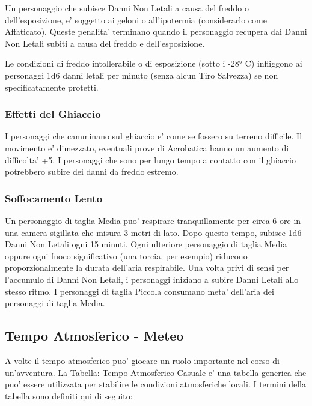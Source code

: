 \documentclass[a4paper,11pt,twoside,openany]{book}
\begin{document}
{		Un personaggio che subisce Danni Non Letali a causa del freddo o dell'esposizione, e' soggetto ai geloni o all'ipotermia (considerarlo come Affaticato). Queste penalita' terminano quando il personaggio recupera dai Danni Non Letali subiti a causa del freddo e dell'esposizione. 
		
		Le condizioni di freddo intollerabile o di esposizione (sotto i -28° C) infliggono ai personaggi 1d6 danni letali per minuto (senza alcun Tiro Salvezza) se non specificatamente protetti.
		
		\subsubsection{Effetti del Ghiaccio}
		
		I personaggi che camminano sul ghiaccio e' come se fossero su terreno difficile. Il movimento e' dimezzato, eventuali prove di Acrobatica hanno un aumento di difficolta' +5. I personaggi che sono per lungo tempo a contatto con il ghiaccio potrebbero subire dei danni da freddo estremo.
		
		\subsubsection{Soffocamento Lento}
		
		Un personaggio di taglia Media puo' respirare tranquillamente per circa 6 ore in una camera sigillata che misura 3 metri di lato. Dopo questo tempo, subisce 1d6 Danni Non Letali ogni 15 minuti. Ogni ulteriore personaggio di taglia Media oppure ogni fuoco significativo (una torcia, per esempio) riducono proporzionalmente la durata dell'aria respirabile. Una volta privi di sensi per l'accumulo di Danni Non Letali, i personaggi iniziano a subire Danni Letali allo stesso ritmo. I personaggi di taglia Piccola consumano meta' dell'aria dei personaggi di taglia Media.
		
		\pagebreak
		
		\subsection{Tempo Atmosferico - Meteo}
		
		\label{tempo-atmosferico---meteo}
		
		A volte il tempo atmosferico puo' giocare un ruolo importante nel corso di un'avventura. La Tabella: Tempo Atmosferico Casuale e' una tabella generica che puo' essere utilizzata per stabilire le condizioni atmosferiche locali. I termini della tabella sono definiti qui di seguito:
		
}
\end{document}
